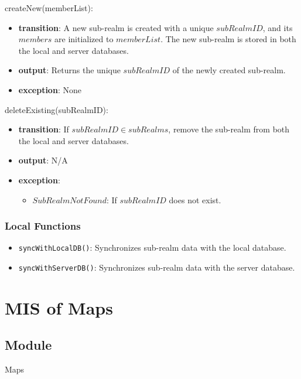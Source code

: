 \documentclass[12pt, titlepage]{article}
\begin{document}
\noindent createNew(memberList):
\begin{itemize}
  \item \textbf{transition}:
        A new sub-realm is created with a unique \( subRealmID \), and its \( members \) are initialized to \( memberList \).
        The new sub-realm is stored in both the local and server databases.
  \item \textbf{output}: Returns the unique \( subRealmID \) of the newly created sub-realm.
  \item \textbf{exception}: None
\end{itemize}

\noindent deleteExisting(subRealmID):
\begin{itemize}
  \item \textbf{transition}:
        If \( subRealmID \in subRealms \), remove the sub-realm from both the local and server databases.
  \item \textbf{output}: N/A
  \item \textbf{exception}:
        \begin{itemize}
          \item \( SubRealmNotFound \): If \( subRealmID \) does not exist.
        \end{itemize}
\end{itemize}

\subsubsection{Local Functions}

\begin{itemize}
  \item \texttt{syncWithLocalDB()}: Synchronizes sub-realm data with the local database.
  \item \texttt{syncWithServerDB()}: Synchronizes sub-realm data with the server database.
\end{itemize}


\newpage


\section{MIS of Maps} \label{maps}

\subsection{Module}

Maps
\end{document}

